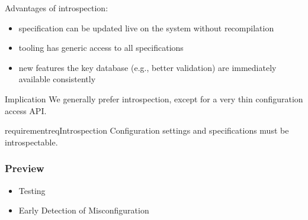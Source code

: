 \begin{frame}
	Advantages of introspection:
	\pause
	\begin{itemize}
	\item specification can be updated live on the system without recompilation
	\item tooling has generic access to all specifications
 	\item new features the key database (e.g., better validation) are immediately available consistently
	\end{itemize}
	\vspace{1em}
	\begin{alertblock}{Implication}
	We generally prefer introspection, except for a very thin configuration access API.
	\end{alertblock}
	\vspace{1em}
	\begin{restatable}{requirement}{reqIntrospection}
	Configuration settings and specifications must be introspectable.%
	\end{restatable}
\end{frame}

\begin{frame}
	\frametitle{Preview}
	\begin{itemize}
	\item Testing
	\item Early Detection of Misconfiguration
	\end{itemize}
\end{frame}



\nocite{raab2017introducing}

\appendix

\begin{frame}[allowframebreaks]
	
	
\end{frame}




